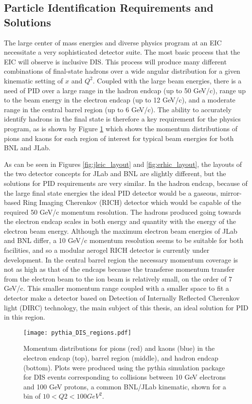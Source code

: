 \subsection{Particle Identification Requirements and Solutions}
The large center of mass energies and diverse physics program at an EIC necessitate a very sophisticated detector suite. The most basic process that the EIC will observe is inclusive DIS. This process will produce many different combinations of final-state hadrons over a wide angular distribution for a given kinematic setting of $x$ and $Q^2$. Coupled with the large beam energies, there is a need of PID over a large range in the hadron endcap (up to 50 GeV/c), range up to the beam energy in the electron endcap (up to 12 GeV/c), and a moderate range in the central barrel region (up to 6 GeV/c). The ability to accurately identify hadrons in the final state is therefore a key requirement for the physics program, as is shown by Figure \ref{fig:pythia_DIS} which shows the momentum distributions of pions and kaons for each region of interest for typical beam energies for both BNL and JLab.

As can be seen in Figures \ref{fig:jleic_layout} and \ref{fig:erhic_layout}, the layouts of the two detector concepts for JLab and BNL are slightly different, but the solutions for PID requirements are very similar. In the hadron endcap, because of the large final state energies the ideal PID detector would be a gaseous, mirror-based Ring Imaging Cherenkov (RICH) detector which would be capable of the required 50 GeV/c momentum resolution. The hadrons produced going towards the electron endcap scales in both energy and quantity with the energy of the electron beam energy. Although the maximum electron beam energies of JLab and BNL differ, a 10 GeV/c momentum resolution seems to be suitable for both facilities, and so a modular aerogel RICH detector is currently under development. In the central barrel region the necessary momentum coverage is not as high as that of the endcaps because the transferse momentum transfer from the electron beam to the ion beam is relatively small, on the order of 7 GeV/c. This smaller momentum range coupled with a smaller space to fit a detector make a detector based on Detection of Internally Reflected Cherenkov light (DIRC) technology, the main subject of this thesis, an ideal solution for PID in this region.


\begin{figure}[ht]
	\centering
	\texttt{[image: pythia\_DIS\_regions.pdf]}
	\caption{Momentum distributions for pions (red) and kaons (blue) in the electron endcap (top), barrel region (middle), and hadron endcap (bottom). Plots were produced using the pythia simulation package for DIS events corresponding to collisions between 10 GeV electrons and 100 GeV protons, a common BNL/JLab kinematic, shown for a bin of $10<Q2<100\unit{GeV}^2$.}
	\label{fig:pythia_DIS}
\end{figure}


